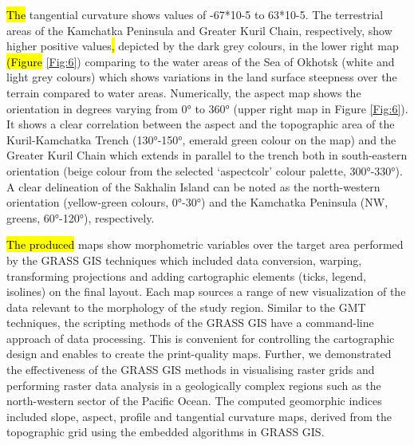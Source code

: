 \documentclass[technologies,article,submit,pdftex,moreauthors]{Definitions/mdpi}
\begin{document}
\hl{The }tangential curvature shows values of -67*10-5 to 63*10-5. The terrestrial areas of the Kamchatka Peninsula and Greater Kuril Chain, respectively, show higher positive values\hl{, }depicted by the dark grey colours, in the lower right map \hl{(Figure }\ref{Fig:6}) comparing to the water areas of the Sea of Okhotsk (white and light grey colours) which shows variations in the land surface steepness over the terrain compared to water areas. Numerically, the aspect map shows the orientation in degrees varying from 0° to 360° (upper right map in Figure \ref{Fig:6}). It shows a clear correlation between the aspect and the topographic area of the Kuril-Kamchatka Trench (130°-150°, emerald green colour on the map) and the Greater Kuril Chain which extends in parallel to the trench both in south-eastern orientation (beige colour from the selected ‘aspectcolr’ colour palette, 300°-330°). A clear delineation of the Sakhalin Island can be noted as the north-western orientation (yellow-green colours, 0°-30°) and the Kamchatka Peninsula (NW, greens, 60°-120°), respectively.

\hl{The produced }maps show morphometric variables over the target area performed by the GRASS GIS techniques which included data conversion, warping, transforming projections and adding cartographic elements (ticks, legend, isolines) on the final layout. Each map sources a range of new visualization of the data relevant to the morphology of the study region. Similar to the GMT techniques, the scripting methods  of the GRASS GIS have a command-line approach of data processing. This is convenient for controlling the cartographic design and enables to create the print-quality maps. Further, we demonstrated the effectiveness of the GRASS GIS methods in visualising raster grids and performing raster data analysis in a geologically complex regions such as the north-western sector of the Pacific Ocean.\hl{ }The computed geomorphic indices included slope, aspect, profile and tangential curvature maps, derived from the topographic grid using the embedded algorithms in GRASS GIS. 
\end{document}
